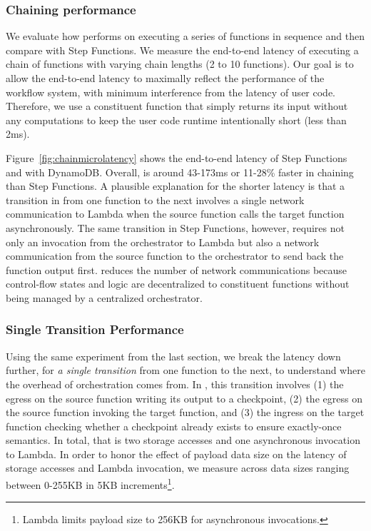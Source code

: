 \subsubsection{Chaining performance}\label{sec:eval:chain}

We evaluate how \name{} performs on executing a series of functions in
sequence and then compare with Step Functions. We measure the end-to-end
latency of executing a chain of functions with varying chain lengths (2 to 10
functions). Our goal is to allow the end-to-end latency to maximally reflect
the performance of the workflow system, with minimum interference from the
latency of user code. Therefore, we use a constituent function that simply
returns its input without any computations to keep the user code runtime
intentionally short (less than 2ms).

Figure~\ref{fig:chainmicrolatency} shows the end-to-end latency of Step
Functions and \name{} with DynamoDB. Overall, \name{} is around 43-173ms or
11-28\% faster in chaining than Step Functions. A plausible explanation for
the shorter latency is that a transition in \name{} from one function to the
next involves a single network communication to Lambda when the source
function calls the target function asynchronously. The same transition in Step
Functions, however, requires not only an invocation from the orchestrator to
Lambda but also a network communication from the source function to the
orchestrator to send back the function output first. \name{} reduces
the number of network communications because control-flow states and logic are
decentralized to constituent functions without being managed by a centralized
orchestrator.

\subsubsection{Single Transition Performance}

Using the same experiment from the last section, we break the
latency down further, for \emph{a single transition} from one function to the next, to
understand where the overhead of orchestration comes from. In \name{}, this
transition involves (1) the egress on the source function writing its output
to a checkpoint, (2) the egress on the source function invoking the target
function, and (3) the ingress on the target function checking whether a
checkpoint already exists to ensure exactly-once semantics. In total, that is
two storage accesses and one asynchronous invocation to Lambda. In order to
honor the effect of payload data size on the latency of storage accesses and
Lambda invocation, we measure across data sizes ranging between 0-255KB in 5KB
increments\footnote{Lambda limits payload size to 256KB for asynchronous
invocations.}.

